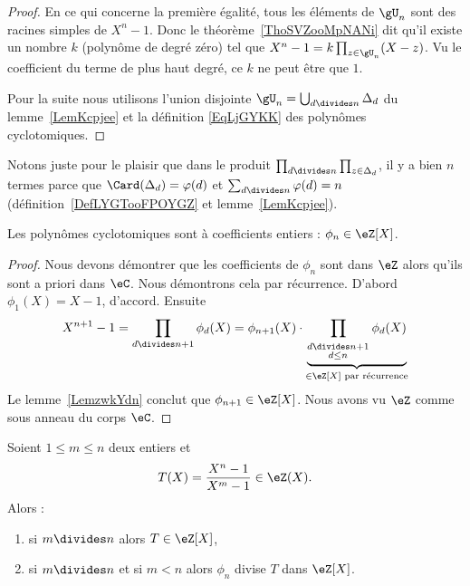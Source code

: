 \begin{proof}
    En ce qui concerne la première égalité, tous les éléments de \( \gU_n\) sont des racines simples de \( X^n-1\). Donc le théorème~\ref{ThoSVZooMpNANi} dit qu'il existe un nombre \( k\) (polynôme de degré zéro) tel que \( X^n-1=k\prod_{z\in \gU_n}(X-z)\). Vu le coefficient du terme de plus haut degré, ce \( k\) ne peut être que \( 1\).

    Pour la suite nous utilisons l'union disjointe \( \gU_n=\bigcup_{d\divides n}\Delta_d\) du lemme~\ref{LemKcpjee} et la définition \eqref{EqLjGYKK} des polynômes cyclotomiques.
\end{proof}

\begin{remark}
    Notons juste pour le plaisir que dans le produit \( \prod_{d\divides n}\prod_{z\in\Delta_d}\), il y a bien \( n\) termes parce que \( \Card(\Delta_d)=\varphi(d)\) et \( \sum_{d\divides n}\varphi(d)=n\) (définition~\ref{DefLYGTooFPOYGZ} et lemme~\ref{LemKcpjee}).
\end{remark}

\begin{proposition}
    Les polynômes cyclotomiques sont à coefficients entiers : \( \phi_n\in \eZ[X]\).
\end{proposition}

\begin{proof}
            Nous devons démontrer que les coefficients de \( \phi_n\) sont dans \( \eZ\) alors qu'ils sont a priori dans \( \eC\). Nous démontrons cela par récurrence. D'abord \( \phi_1(X)=X-1\), d'accord. Ensuite
            \begin{equation}
                X^{n+1}-1=\prod_{d\divides n+1}\phi_d(X)=\phi_{n+1}(X)\cdot\underbrace{\prod_{_{\substack{d\divides n+1\\d\leq n}}}\phi_d(X)}_{\in\eZ[X]\text{ par récurrence}}
            \end{equation}
            Le lemme~\ref{LemzwkYdn} conclut que \( \phi_{n+1}\in \eZ[X]\). Nous avons vu \( \eZ\) comme sous anneau du corps \( \eC\).
\end{proof}

\begin{proposition}     \label{PropUImYnL}
    Soient \( 1\leq m\leq n\) deux entiers et
    \begin{equation}
        T(X)=\frac{ X^n-1 }{ X^m-1 }\in \eZ(X).
    \end{equation}
    Alors :
    \begin{enumerate}
        \item   \label{ItemhpDPKE}
            si \( m\divides n\) alors \( T\in \eZ[X]\),
        \item
            si \( m\divides n\) et si \( m<n\) alors \( \phi_n\) divise \( T\) dans \( \eZ[X]\).
    \end{enumerate}
\end{proposition}

